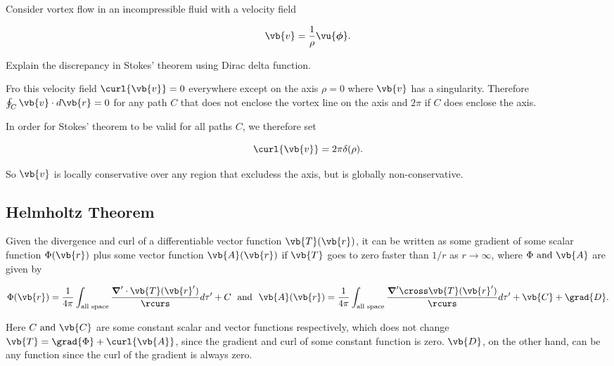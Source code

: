 \documentclass[english,a4paper,12pt]{report}
\begin{document}
{Consider vortex flow in an incompressible fluid with a velocity field

\begin{equation}
	\vb{v} = \frac{1}{\rho } \vu{\boldsymbol{\phi } }. 
\end{equation}

Explain the discrepancy in Stokes' theorem using Dirac delta function.
}
{Fro this velocity field \(\curl{\vb{v} } =0\) everywhere except on the axis \(\rho =0\) where \(\vb{v}\) has a singularity. Therefore \( \oint_{C} \vb{v} \cdot d\vb{r} =0\) for any path \(C\) that does not enclose the vortex line on the axis and \(2\pi \) if \(C\) does enclose the axis.

In order for Stokes' theorem to be valid for all paths \(C\), we therefore set 

\begin{equation}
	\curl{\vb{v} } = 2\pi \delta (\rho ).
\end{equation}

So \(\vb{v} \) is locally conservative over any region that excludess the axis, but is globally non-conservative. 

} 


	
\subsection{Helmholtz Theorem}

\begin{theorem}
Given the divergence and curl of a differentiable vector function \(\vb{T}(\vb{r} ) \), it can be written as some gradient of some scalar function \(\Phi(\vb{r} ) \) plus some vector function \(\vb{A}(\vb{r} ) \) if \(\vb{T} \) goes to zero faster than \(1 /r \) as \(r \to \infty\), where \(\Phi \text { and } \vb{A} \) are given by

\begin{equation}
	\Phi(\vb{r} ) = \frac{1}{4\pi } \int_{\text{all space} } \frac{\boldsymbol{\nabla}' \cdot \vb{T} (\vb{r} ')}{\rcurs } d\tau ' + C~\text { and }~ \vb{A} (\vb{r} ) = \frac{1}{4\pi } \int_{\text{all space} } \frac{\boldsymbol{\nabla}' \cross \vb{T} (\vb{r} ')}{\rcurs } d\tau ' + \vb{C} + \grad{D} .
\end{equation}

Here \(C \text { and }  \vb{C} \) are some constant scalar and vector functions respectively, which does not change \(\vb{T} = \grad{\Phi } + \curl{\vb{A} }\), since the gradient and curl of some constant function is zero. \(\vb{D}\), on the other hand, can be any function since the curl of the gradient is always zero. 

\end{theorem}
\end{document}
